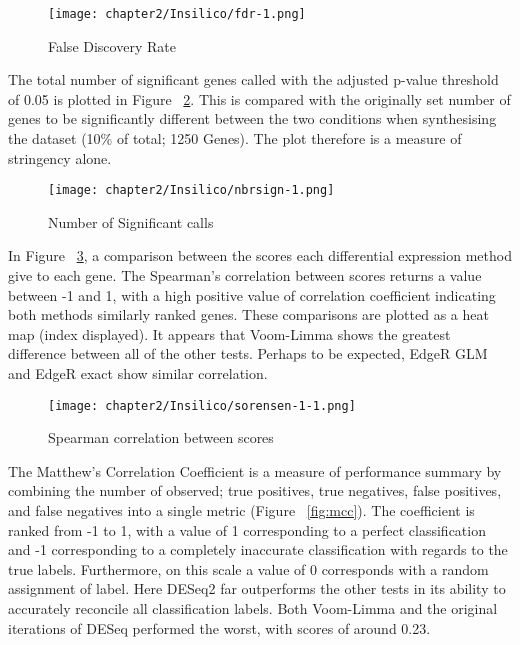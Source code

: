 \begin{figure}[!htbp]
  \centering 
  \texttt{[image: chapter2/Insilico/fdr-1.png]}
  \caption[n=3 False Discovery Rate]{False Discovery Rate}
  \label{fig:fdr1}
\end{figure} 

The total number of significant genes called with the adjusted p-value threshold of 0.05 is plotted in Figure ~\ref{fig:numbersig}. This is compared with the originally set number of genes to be significantly different between the two conditions when synthesising the dataset (10\% of total; 1250 Genes). The plot therefore is a measure of stringency alone. \\

\begin{figure}[!htbp]
  \centering 
  \texttt{[image: chapter2/Insilico/nbrsign-1.png]}
  \caption[n=3 Number of Significant Calls]{Number of Significant calls}
  \label{fig:numbersig}
\end{figure} 

In Figure ~\ref{fig:spearman}, a comparison between the scores each differential expression method give to each gene. The Spearman’s correlation between scores returns a value between -1 and 1, with a high positive value of correlation coefficient indicating both methods similarly ranked genes. These comparisons are plotted as a heat map (index displayed). It appears that Voom-Limma shows the greatest difference between all of the other tests. Perhaps to be expected, EdgeR GLM and EdgeR exact show similar correlation. \\

\begin{figure}[!htbp]
  \centering 
  \texttt{[image: chapter2/Insilico/sorensen-1-1.png]} 
  \caption[n=3 Spearman Correlation Coefficient]{Spearman correlation between scores}
  \label{fig:spearman}
\end{figure} 

The Matthew's Correlation Coefficient is a measure of performance summary by combining the number of observed; true positives, true negatives, false positives, and false negatives into a single metric (Figure  ~\ref{fig:mcc}). The coefficient is ranked from -1 to 1, with a value of 1 corresponding to a perfect classification and -1 corresponding to a completely inaccurate classification with regards to the true labels. Furthermore, on this scale a value of 0 corresponds with a random assignment of label. Here DESeq2 far outperforms the other tests in its ability to accurately reconcile all classification labels. Both Voom-Limma and the original iterations of DESeq performed the worst, with scores of around 0.23. \\

